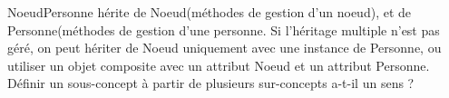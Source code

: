  NoeudPersonne hérite de Noeud(méthodes de gestion d'un noeud), et de Personne(méthodes de gestion d'une personne. Si l'héritage multiple n'est pas géré, on peut hériter de Noeud uniquement avec une instance de Personne, ou utiliser un objet composite avec un attribut Noeud et un attribut Personne.\\

 Définir un sous-concept à partir de plusieurs sur-concepts a-t-il un sens ?
